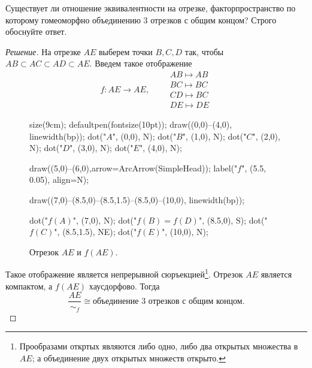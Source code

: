 \documentclass[10pt]{article}
\begin{document}
\begin{tasks}
	 \item  Существует ли отношение эквивалентности на отрезке, факторпространство по которому гомеоморфно объединению 3 отрезков с общим концом? Строго обоснуйте ответ.
	
	\begin{proof}[Решение]
		На отрезке $AE$ выберем точки $B, C, D$ так, чтобы $AB \subset AC \subset AD \subset AE.$ Введем такое отображение $$f \colon AE \to AE, \qquad \left.\begin{aligned}
			AB \mapsto AB\\
			BC \mapsto BC\\
			CD \mapsto BC\\
			DE \mapsto DE
		\end{aligned} \right.$$
		
		\begin{figure}[h]
			\centering
			\begin{asy}
				size(9cm);
				defaultpen(fontsize(10pt));
				draw((0,0)--(4,0), linewidth(bp));
				dot("$A$", (0,0), N);
				dot("$B$", (1,0), N);
				dot("$C$", (2,0), N);
				dot("$D$", (3,0), N);
				dot("$E$", (4,0), N);
				
				draw((5,0)--(6,0),arrow=ArcArrow(SimpleHead));
				label("$f$", (5.5, 0.05), align=N);
				
				draw((7,0)--(8.5,0)--(8.5,1.5)--(8.5,0)--(10,0), linewidth(bp));
				
				dot("$f(A)$", (7,0), N);
				dot("$f(B)=f(D)$", (8.5,0), S);
				dot("$f(C)$", (8.5,1.5), NE);
				dot("$f(E)$", (10,0), N);
				
			\end{asy}
			\caption{Отрезок $AE$ и $f(AE)$.}
		\end{figure}
		
		Такое отображение является непрерывной сюръекцией\footnote{Прообразами откртых являются либо одно, либо два открытых множества в $AE$; а объединение двух открытых множеств открыто.}. Отрезок $AE$ является компактом, а $f(AE)$ хаусдорфово. Тогда \[\frac{AE}{\sim_f} \cong \text{объединение 3 отрезков с общим концом}.\]  
		
	\end{proof}
	
	
	

\end{tasks}
\end{document}
